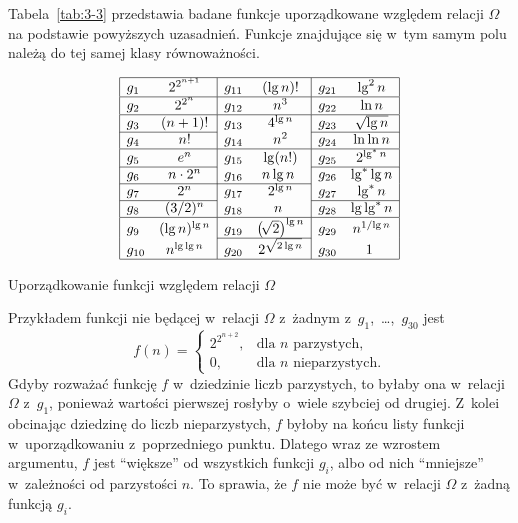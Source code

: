 Tabela~\ref{tab:3-3} przedstawia badane funkcje uporządkowane względem relacji $\Omega$ na podstawie powyższych uzasadnień. Funkcje znajdujące się w~tym samym polu należą do tej samej klasy równoważności.
\begin{table}[ht]
	\begin{center}
		\[
			\begin{array}{|lc|lc|lc|} \hline
				g_1 & 2^{2^{n+1}} & g_{11} & (\lg n)! & g_{21} & \lg^2n \\ \hline
				g_2 & 2^{2^n} & g_{12} & n^3 & g_{22} & \ln n \\ \hline
				g_3 & (n+1)! & g_{13} & 4^{\lg n} & g_{23} & \sqrt{\lg n} \\ \cline{1-2}\cline{5-6}
				g_4 & n! & g_{14} & n^2 & g_{24} & \ln\ln n \\ \hline
				g_5 & e^n & g_{15} & \lg (n!) & g_{25} & 2^{\lg^*n} \\ \cline{1-2}\cline{5-6}
				g_6 & n\cdot2^n & g_{16} & n\lg n~& g_{26} & \lg^*\lg n \\ \cline{1-4}
				g_7 & 2^n & g_{17} & 2^{\lg n} & g_{27} & \lg^*n \\ \cline{1-2}\cline{5-6}
				g_8 & (3/2)^n & g_{18} & n~& g_{28} & \lg\lg^*n \\ \hline
				g_9 & (\lg n)^{\lg n} & g_{19} & \bigl(\!\sqrt{2}\bigr)^{\lg n} & g_{29} & n^{1/\!\lg n} \\ \cline{3-4}
				g_{10} & n^{\lg\lg n} & g_{20} & 2^{\sqrt{2\lg n}} & g_{30} & 1~\\ \hline
			\end{array}
		\]
	\end{center}
	\caption{Uporządkowanie funkcji względem relacji $\Omega$} \label{tab:3-3}
\end{table}

\subproblem %
Przykładem funkcji nie będącej w~relacji $\Omega$ z~żadnym z~$g_1$,~\dots,~$g_{30}$ jest
\[
	f(n) =
	\begin{cases}
		2^{2^{n+2}}, & \text{dla $n$ parzystych,} \\
		0, & \text{dla $n$ nieparzystych}.
	\end{cases}
\]
Gdyby rozważać funkcję $f$ w~dziedzinie liczb parzystych, to byłaby ona w~relacji $\Omega$ z~$g_1$, ponieważ wartości pierwszej rosłyby o~wiele szybciej od drugiej. Z~kolei obcinając dziedzinę do liczb nieparzystych, $f$ byłoby na końcu listy funkcji w~uporządkowaniu z~poprzedniego punktu. Dlatego wraz ze wzrostem argumentu, $f$ jest ``większe'' od wszystkich funkcji $g_i$, albo od nich ``mniejsze'' w~zależności od parzystości $n$. To sprawia, że $f$ nie może być w~relacji $\Omega$ z~żadną funkcją $g_i$.


